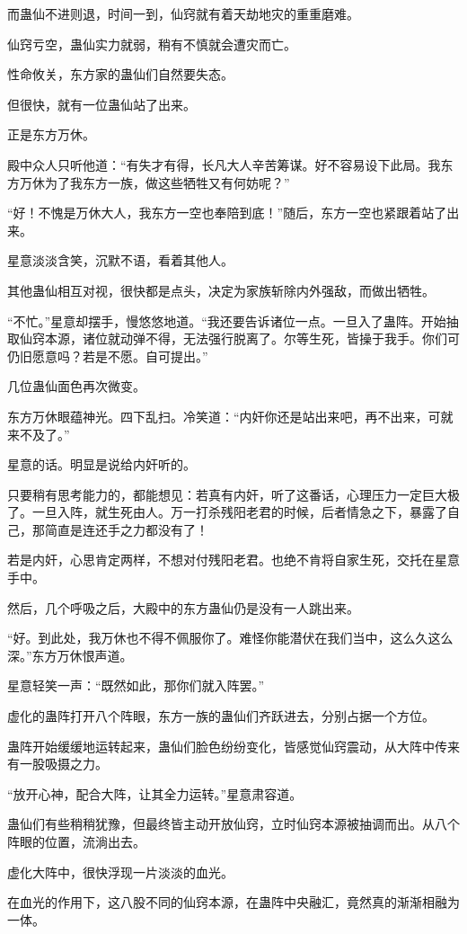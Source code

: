 \begin{this_body}
而蛊仙不进则退，时间一到，仙窍就有着天劫地灾的重重磨难。

仙窍亏空，蛊仙实力就弱，稍有不慎就会遭灾而亡。

性命攸关，东方家的蛊仙们自然要失态。

但很快，就有一位蛊仙站了出来。

正是东方万休。

殿中众人只听他道：“有失才有得，长凡大人辛苦筹谋。好不容易设下此局。我东方万休为了我东方一族，做这些牺牲又有何妨呢？”

“好！不愧是万休大人，我东方一空也奉陪到底！”随后，东方一空也紧跟着站了出来。

星意淡淡含笑，沉默不语，看着其他人。

其他蛊仙相互对视，很快都是点头，决定为家族斩除内外强敌，而做出牺牲。

“不忙。”星意却摆手，慢悠悠地道。“我还要告诉诸位一点。一旦入了蛊阵。开始抽取仙窍本源，诸位就动弹不得，无法强行脱离了。尔等生死，皆操于我手。你们可仍旧愿意吗？若是不愿。自可提出。”

几位蛊仙面色再次微变。

东方万休眼蕴神光。四下乱扫。冷笑道：“内奸你还是站出来吧，再不出来，可就来不及了。”

星意的话。明显是说给内奸听的。

只要稍有思考能力的，都能想见：若真有内奸，听了这番话，心理压力一定巨大极了。一旦入阵，就生死由人。万一打杀残阳老君的时候，后者情急之下，暴露了自己，那简直是连还手之力都没有了！

若是内奸，心思肯定两样，不想对付残阳老君。也绝不肯将自家生死，交托在星意手中。

然后，几个呼吸之后，大殿中的东方蛊仙仍是没有一人跳出来。

“好。到此处，我万休也不得不佩服你了。难怪你能潜伏在我们当中，这么久这么深。”东方万休恨声道。

星意轻笑一声：“既然如此，那你们就入阵罢。”

虚化的蛊阵打开八个阵眼，东方一族的蛊仙们齐跃进去，分别占据一个方位。

蛊阵开始缓缓地运转起来，蛊仙们脸色纷纷变化，皆感觉仙窍震动，从大阵中传来有一股吸摄之力。

“放开心神，配合大阵，让其全力运转。”星意肃容道。

蛊仙们有些稍稍犹豫，但最终皆主动开放仙窍，立时仙窍本源被抽调而出。从八个阵眼的位置，流淌出去。

虚化大阵中，很快浮现一片淡淡的血光。

在血光的作用下，这八股不同的仙窍本源，在蛊阵中央融汇，竟然真的渐渐相融为一体。


\end{this_body}
